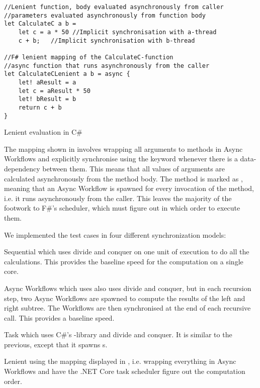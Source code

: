 \begin{listing}[H]
\begin{verbatim}
//Lenient function, body evaluated asynchronously from caller
//parameters evaluated asynchronously from function body
let CalculateC a b = 
    let c = a * 50 //Implicit synchronisation with a-thread
    c + b;   //Implicit synchronisation with b-thread

//F# lenient mapping of the CalculateC-function
//async function that runs asynchronously from the caller
let CalculateCLenient a b = async {
    let! aResult = a
    let c = aResult * 50
    let! bResult = b
    return c + b  
}
\end{verbatim}
\caption{Lenient evaluation in C\#} \label{lst:lenient:to:task}
\end{listing}
The mapping shown in  involves wrapping all arguments to methods in Async Workflows and explicitly synchronise using the  keyword whenever there is a data-dependency between them. This means that all values of arguments are calculated asynchronously from the method body. The method is marked as , meaning that an Async Workflow is spawned for every invocation of the method, i.e. it runs asynchronously from the caller. This leaves the majority of the footwork to F\#'s scheduler, which must figure out in which order to execute them.

We implemented the test cases in four different synchronization models:
\begin{labeling}{\quad\quad}
    \item[Sequential] which uses divide and conquer on one unit of execution to do all the calculations. This provides the baseline speed for the computation on a single core.
    \item[Async Workflows] which uses also uses divide and conquer, but in each recursion step, two Async Workflows are spawned to compute the results of the left and right subtree. The Workflows are then synchronised at the end of each recursive call. This provides a \textit{} baseline speed.
    \item[Task] which uses C\#'s -library and divide and conquer. It is similar to the previous, except that it spawns s.  
    \item[Lenient] using the mapping displayed in , i.e. wrapping everything in Async Workflows and have the .NET Core task scheduler figure out the computation order.
\end{labeling}

